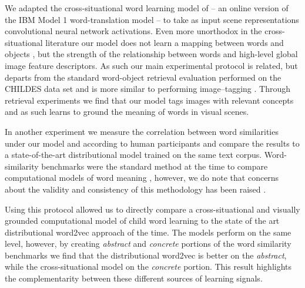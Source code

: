 We adapted the cross-situational word learning model of \cite{fazly.etal.10} -- an 
online version of the IBM Model 1 word-translation model \citep{BrownPPM94} -- to take as input scene
representations convolutional neural network activations.
Even more unorthodox in the cross-situational literature our model does not learn a mapping between 
words and objects 
\citep{fazly.etal.10,lazaridou2016multimodal}, but the strength of the relationship between words and high-level
global image feature descriptors. As such our main experimental protocol is related, but departs from
the standard word-object retrieval evaluation performed on the CHILDES data set \citep{goodman2008bayesian,kievit2013naturalistic,lazaridou2016multimodal} and is more similar
to performing image--tagging \citep{weston2010large}. Through retrieval experiments we find that
our model tags images with relevant concepts and as such learns to ground the meaning of words in visual
scenes.

In another experiment we measure the
correlation between word similarities under our model and according to human participants and compare
the results to a state-of-the-art distributional model trained on the same text corpus.
Word-similarity benchmarks were the standard method at the time to compare
computational models of word meaning \citep{faruqui2014community}, however,
we do note that concerns about the validity and consistency of this methodology has been 
raised \citep{faruqui2016problems}.

Using this protocol allowed us to directly compare a cross-situational and visually grounded computational
model of child word learning to the state of the art distributional word2vec approach of the time. 
The models perform on the same level, however, by creating
\emph{abstract} and  \emph{concrete} portions of the word similarity benchmarks we find that
the distributional word2vec is better on the \emph{abstract}, while the cross-situational model on the 
\emph{concrete} portion. This result highlights the complementarity
between these different sources of learning signals.


